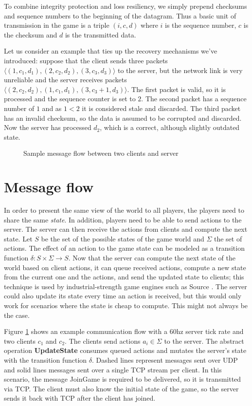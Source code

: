 \documentclass[sigconf, nonacm=true, natbib=false]{acmart}
\begin{document}
To combine integrity protection and loss resiliency, we simply prepend checksums and sequence numbers to the beginning of the datagram.
Thus a basic unit of transmission in the game is a triple $(i, c, d)$ where $i$ is the sequence number, $c$ is the checksum and $d$ is the transmitted data.

\sloppy Let us consider an example that ties up the recovery mechanisms we've introduced: suppose that the client sends three packets
$\langle (1, c_1, d_1), (2, c_2, d_2), (3, c_3, d_3) \rangle$ to the server, but the network link is very unreliable and the server receives
packets $\langle (2, c_2, d_2), (1, c_1, d_1), (3, c_3 + 1, d_3) \rangle$. The first packet is valid, so it is processed and the sequence counter is set to $2$.
The second packet has a sequence number of $1$ and as $1 < 2$ it is considered stale and discarded. The third packet has an invalid checksum, so the
data is assumed to be corrupted and discarded. Now the server has processed $d_2$, which is a correct, although slightly outdated state.

\begin{figure}
  \centering
  
  \caption{Sample message flow between two clients and server}
  \label{fig:msgflow}
\end{figure}

\section{Message flow}

In order to present the same view of the world to all players, the players need to share the same \emph{state}.
In addition, players need to be able to send actions to the
server. The server can then receive the actions from clients and compute the next state.
Let $S$ be the set of the possible states of the game world and $\Sigma$ the set of actions. The effect of an action to
the game state can be modeled as a transition function $\delta: S \times \Sigma \to S$. Now that the server can compute
the next state of the world based on client actions, it can queue received actions, compute a new state from the current one
and the actions, and send the updated state to clients; this technique is used by industrial-strength game engines such as Source \cite{Source1}.
The server could also update its state every time an action is received, but this would only work for scenarios where the
state is cheap to compute. This might not always be the case.

Figure \ref{fig:msgflow} shows an example communication flow with
a 60hz server tick rate and two clients $c_1$ and $c_2$. The clients send actions $a_i \in \Sigma$ to the server.
The abstract operation \textbf{\textsf{UpdateState}} consumes queued actions and mutates the server's state with the 
transition function $\delta$. Dashed lines represent messages sent over UDP and solid lines messages sent over a single TCP
stream per client. In this scenario, the message \textsf{JoinGame} is required to be delivered, so it is transmitted via TCP.
The client must also know the initial state of the game, so the server sends it back with TCP after the client
has joined.
\end{document}
